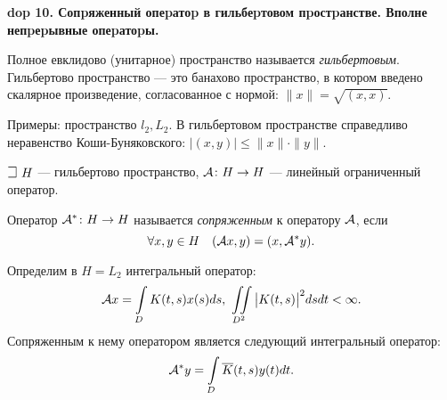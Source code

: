 \textbf{\LARGE dop 10. Сопpяженный опеpатоp в гильбеpтовом пpостpанстве. Вполне непpеpывные опеpатоpы.}

\begin{definition}
Полное евклидово (унитарное) пространство называется \emph{гильбертовым}. Гильбертово пространство --- это банахово пространство, в котором введено скалярное произведение, согласованное с нормой: $\|x\| = \sqrt{(x, x)}$.
\end{definition}

\begin{Commentwhite}
Примеры: пространство $l_2, L_2$. В гильбертовом пространстве справедливо неравенство Коши-Буняковского: $|(x, y)|\le\|x\|\cdot\|y\|$.
\end{Commentwhite}

\begin{Commentwhite}
$\mathLet~H$ --- гильбертово пространство, ${\mathcal{A}}\colon H\to H$ --- линейный ограниченный оператор.
\end{Commentwhite}

\begin{definition}
Оператор ${\mathcal{A}}^*\colon H\to H$ называется \emph{сопряженным} к оператору ${\mathcal{A}}$, если
$$\forall x,y\in H \quad ({\mathcal{A}} x, y) = (x,{\mathcal{A}}^* y).$$
\end{definition}

\begin{example}
Определим в $H=L_2$ интегральный оператор:
$${\mathcal{A}} x = \int\limits_D K(t, s) x(s) ds,~\iint\limits_{D^2}\big|K(t, s)\big|^2 ds dt < \infty.$$
Сопряженным к нему оператором является следующий интегральный оператор:
$${\mathcal{A}}^* y = \int\limits_D \overline{K}(t, s) y(t) dt.$$
\end{example}

